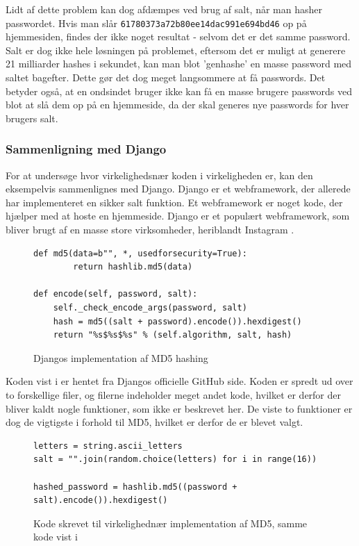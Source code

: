 \documentclass[12pt]{article}
\begin{document}
Lidt af dette problem kan dog afdæmpes ved brug af salt, når man hasher passwordet. Hvis man slår \verb|61780373a72b80ee14dac991e694bd46| op på hjemmesiden, findes der ikke noget resultat - selvom det er det samme password. Salt er dog ikke hele løsningen på problemet, eftersom det er muligt at generere 21 milliarder hashes i sekundet, kan man blot 'genhashe' en masse password med saltet bagefter. Dette gør det dog meget langsommere at få passwords. Det betyder også, at en ondsindet bruger ikke kan få en masse brugere passwords ved blot at slå dem op på en hjemmeside, da der skal generes nye passwords for hver brugers salt. 


\subsubsection{Sammenligning med Django}
For at undersøge hvor virkelighedsnær koden i virkeligheden er, kan den eksempelvis sammenlignes med Django. Django er et webframework, der allerede har implementeret en sikker salt funktion. Et webframework er noget kode, der hjælper med at hoste en hjemmeside. Django er et populært webframework, som bliver brugt af en masse store virksomheder, heriblandt Instagram \cite{noauthor_django_nodate}. 

\begin{figure}[ht]
\begin{verbatim}
def md5(data=b"", *, usedforsecurity=True):
        return hashlib.md5(data)

def encode(self, password, salt):
    self._check_encode_args(password, salt)
    hash = md5((salt + password).encode()).hexdigest()
    return "%s$%s$%s" % (self.algorithm, salt, hash)
\end{verbatim}
\caption{Djangos implementation af MD5 hashing \cite{noauthor_django_2022-2}\cite{noauthor_django_2022}}
\label{code:django-md5}
\end{figure}

Koden vist i \figureautorefname{~\ref{code:django-md5}} er hentet fra Djangos officielle GitHub side. Koden er spredt ud over to forskellige filer, og filerne indeholder meget andet kode, hvilket er derfor der bliver kaldt nogle funktioner, som ikke er beskrevet her. De viste to funktioner er dog de vigtigste i forhold til MD5, hvilket er derfor de er blevet valgt. 

\begin{figure}[ht]
\begin{verbatim}
letters = string.ascii_letters  
salt = "".join(random.choice(letters) for i in range(16))  

hashed_password = hashlib.md5((password + salt).encode()).hexdigest()
\end{verbatim}
\caption{Kode skrevet til virkelighednær implementation af MD5, samme kode vist i \figureautorefname{~\ref{code:create-user-w-salt}}}
\label{code:django-comp-code}
\end{figure}
\end{document}
